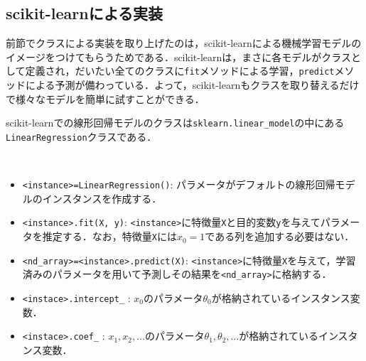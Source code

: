 \subsection{scikit-learnによる実装}

前節でクラスによる実装を取り上げたのは，scikit-learnによる機械学習モデルのイメージをつけてもらうためである．scikit-learnは，まさに各モデルがクラスとして定義され，だいたい全てのクラスに\texttt{fit}メソッドによる学習，\texttt{predict}メソッドによる予測が備わっている．よって，scikit-learnもクラスを取り替えるだけで様々なモデルを簡単に試すことができる．

scikit-learnでの線形回帰モデルのクラスは\texttt{sklearn.linear\_model}の中にある\texttt{LinearRegression}クラスである．
\begin{gram}　
\begin{itemize}
\item \texttt{<instance>=LinearRegression()}: パラメータがデフォルトの線形回帰モデルのインスタンスを作成する．
\item \texttt{<instance>.fit(X, y)}: \texttt{<instance>}に特徴量\texttt{X}と目的変数\texttt{y}を与えてパラメータを推定する．なお，特徴量\texttt{X}には$x_0=1$である列を追加する必要はない．
\item \texttt{<nd\_array>=<instance>.predict(X)}: \texttt{<instance>}に特徴量\texttt{X}を与えて，学習済みのパラメータを用いて予測しその結果を\texttt{<nd\_array>}に格納する．
\item \texttt{<instace>.intercept\_} : $x_0$のパラメータ$\theta_0$が格納されているインスタンス変数．
\item \texttt{<instace>.coef\_} : $x_1,x_2,\ldots$のパラメータ$\theta_1,\theta_2,\ldots$が格納されているインスタンス変数．
\end{itemize}
\end{gram}
\begin{cod}[\texttt{pd3.py}]　
}]{code/pd3.py}
\vspace{-10pt}
\begin{lstlisting}
df=
   population   profit  all_1  ndarray  list
0      6.1101  17.5920      1        0     0
1      5.5277   9.1302      1        1     1
2      8.5186  13.6620      1        2     2
3      7.0032  11.8540      1        3     3
4      5.8598   6.8233      1        4     4
\end{lstlisting}
\end{cod}
\vspace{-10pt}

